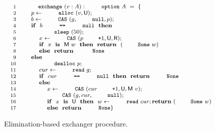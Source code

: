 {
\begin{figure}
\centering
\[
{\small{
\begin{array}{rl}
 \Num{1} & \esc{exchange}~(v : A) : \esc{option}~A~=~\{ 
\\ 
 \Num{2} & ~~~~ p \Asgn \esc{alloc}~(v, \Unmatched);\\
 \Num{3} & ~~~~ b \Asgn \esc{CAS}~(g, \esc{null}, p);\\
 \Num{4} & ~~~~ \kw{if}~~b~\esc{==}~\esc{null}~~\kw{then}\\
 \Num{5} & ~~~~ ~~~~ \esc{sleep}~(50);\\
 \Num{6} & ~~~~ ~~~~ x \Asgn \esc{CAS}~(p\esc{+}1, \Unmatched, \Retired);\\
 \Num{7} & ~~~~ ~~~~ \kw{if}~~x~~\kw{is}~~\Matched w~~\kw{then}~~\kw{return}~~(\esc{Some}~w)\\
 \Num{8} & ~~~~ ~~~~ \kw{else}~~\kw{return}~~\esc{None}\\
 \Num{9} & ~~~~ \kw{else}\\
\Num{10} & ~~~~ ~~~~ \esc{dealloc}~p;\\
\Num{11} & ~~~~ ~~~~ cur \Asgn \esc{read}~g;\\
\Num{12} & ~~~~ ~~~~ \kw{if}~~cur~\esc{==}~\esc{null}~~\kw{then}~~\kw{return}~{\esc{None}}\\
\Num{13} & ~~~~ ~~~~ \kw{else}\\
\Num{14} & ~~~~ ~~~~ ~~~~ x \Asgn \esc{CAS}~(cur\esc{+}1, \Unmatched, \Matched v);\\
\Num{15} & ~~~~ ~~~~ ~~~~ \esc{CAS}~(g, cur, \esc{null});\\
\Num{16} & ~~~~ ~~~~ ~~~~ \kw{if}~~x~~\kw{is}~~\Unmatched~~\kw{then}~~w\Asgn \esc{read}~cur;\kw{return}~(\esc{Some}\ w)\\
\Num{17} & ~~~~ ~~~~ ~~~~ \kw{else}~~\kw{return}~\esc{None}\}
\end{array}
}}
\]
\caption{Elimination-based exchanger procedure.}
\label{fig:exchanger}
\end{figure} 
}

